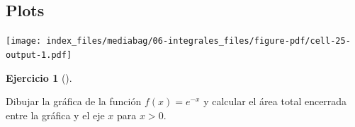 \documentclass[
  a4paper,
]{scrreport}
\newenvironment{Shaded}{\begin{snugshade}}{\end{snugshade}}
\newcommand{\BuiltInTok}[1]{\textcolor[rgb]{0.00,0.23,0.31}{#1}}
\newcommand{\FloatTok}[1]{\textcolor[rgb]{0.68,0.00,0.00}{#1}}
\newcommand{\FunctionTok}[1]{\textcolor[rgb]{0.28,0.35,0.67}{#1}}
\newcommand{\ImportTok}[1]{\textcolor[rgb]{0.00,0.46,0.62}{#1}}
\newcommand{\NormalTok}[1]{\textcolor[rgb]{0.00,0.23,0.31}{#1}}
\newcommand{\OperatorTok}[1]{\textcolor[rgb]{0.37,0.37,0.37}{#1}}
\newcommand{\SpecialCharTok}[1]{\textcolor[rgb]{0.37,0.37,0.37}{#1}}
\newcommand{\StringTok}[1]{\textcolor[rgb]{0.13,0.47,0.30}{#1}}
\theoremstyle{definition}
\newtheorem{exercise}{Ejercicio}[chapter]
\theoremstyle{remark}
\begin{document}
\begin{tcolorbox}
\section{Plots}

\begin{Shaded}
\end{Shaded}

\texttt{[image: index\_files/mediabag/06-integrales\_files/figure-pdf/cell-25-output-1.pdf]}

\end{tcolorbox}

\begin{exercise}[]\protect\hypertarget{exr-integral-impropia}{}\label{exr-integral-impropia}

Dibujar la gráfica de la función \(f(x)=e^{-x}\) y calcular el área
total encerrada entre la gráfica y el eje \(x\) para \(x>0\).

\end{exercise}
\end{document}
